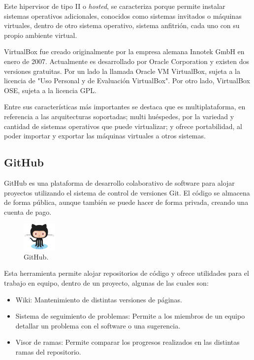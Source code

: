 Este hipervisor de tipo II o \textit{hosted}, se caracteriza porque permite instalar sistemas operativos adicionales, conocidos como sistemas invitados o máquinas virtuales, dentro de otro sistema operativo, sistema anfitrión, cada uno con su propio ambiente virtual.

VirtualBox fue creado originalmente por la empresa alemana Innotek GmbH en enero de 2007. Actualmente es desarrollado por Oracle Corporation y existen dos versiones gratuitas. Por un lado la llamada Oracle VM VirtualBox, sujeta a la licencia de "Uso Personal y de Evaluación VirtualBox". Por otro lado, VirtualBox OSE, sujeta a la licencia GPL.

Entre sus características más importantes se destaca que es multiplataforma, en referencia a las arquitecturas soportadas; multi huéspedes, por la variedad y cantidad de sistemas operativos que puede virtualizar; y ofrece portabilidad, al poder importar y exportar las máquinas virtuales a otros sistemas.

\subsection{GitHub}

GitHub es una plataforma de desarrollo colaborativo de software para alojar proyectos utilizando el sistema de control de versiones Git. El código se almacena de forma pública, aunque también se puede hacer de forma privada, creando una cuenta de pago.

\begin{figure}[H]
\centering
\includegraphics[width=0.15\textwidth]{images/figures/github.png}
\caption{GitHub.\footnotemark}
\end{figure}


Esta herramienta permite alojar repositorios de código y ofrece utilidades para el trabajo en equipo, dentro de un proyecto, algunas de las cuales son:
\begin{itemize}
\item Wiki: Mantenimiento de distintas versiones de páginas.
\item Sistema de seguimiento de problemas: Permite a los miembros de un equipo detallar un problema con el software o una sugerencia.
\item Visor de ramas: Permite comparar los progresos realizados en las distintas ramas del repositorio.
\end{itemize}

